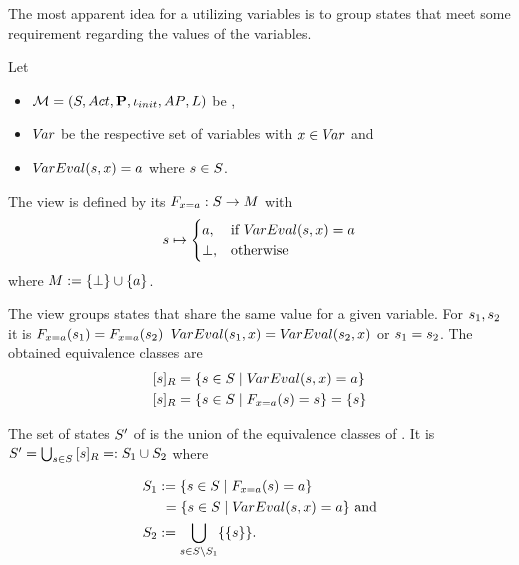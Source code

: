 \documentclass[preview]{standalone}
\begin{document}
The most apparent idea for a \viewN utilizing variables is to group states that meet some requirement regarding the values of the variables.



\begin{definition}
	Let
	\begin{itemize}
		\item ${{{\mathcal{M}}}} = {{({S}, {Act}, {\textbf{P}}, {\iota_{init}}, {AP}, {L})}}$ be \achgphN,
		\item ${V\!ar}$ be the respective set of variables with ${x} \in {V\!ar}$ and
		\item ${V\!arEval}({s}, {x}) = {a}$ where ${s} \in {S}$.		
	\end{itemize} 
	The view \viewparamvalueseq is defined by its \grpfctN ${{F_{{x} = {a}}}} : {S} \to {\ensuremath{{M}}}$ with
	\[
	{s} \mapsto
	\begin{cases}
		{a}, &\text{if } {V\!arEval}({s}, {x}) = {a}\\
		{\bot}, &\text{otherwise}
	\end{cases}
	\]
	where ${{M}} := {\{\bot\}} \cup \{a\}$.
\end{definition}

The view \viewparamvalueseq groups states that share the same value for a given variable. For ${s}_1, {s}_2$ it is ${{F_{{x} = {a}}}}({s}_1) = {{F_{{x} = {a}}}}({s}_2)$ \iffN ${V\!arEval}({s}_1, {x}) = {V\!arEval}({s}_2, {x})$ or ${s}_1 = {s}_2$. The obtained equivalence classes are
\begin{align*}
	{\ensuremath{{[{s}]_{{R}}}}} &= \{{s} \in {S} \mid {V\!arEval}({s}, {x}) = {a}\} \\
	{{[{s}]_{{R}}}} &= \{{s} \in {S} \mid {\ensuremath{{F_{{x} = {a}}}}}({s}) = {s}\} = \{{s}\}
\end{align*}

The set of states ${S}'$ of \viewparamvalueseq is the union of the equivalence classes of \eqrelview. It is ${S}' = \bigcup_{{s} \in {S}} {{[{s}]_{{R}}}} =: {S}_1 \cup {S}_2$ where

\begin{align*}
	{S}_1 &:= \{{s} \in {S} \mid {\ensuremath{{F_{{x} = {a}}}}}({s}) = {a}\} \\
	&\hspace{1.15mm}= \{{s} \in {S}  \mid {V\!arEval}({s}, {x}) = {a}\} \text{ and} \\
	{S}_2 &:= {\bigcup_{{s} \in {S} \setminus {S}_1}\{\{{s}\}\}}.
\end{align*}
\end{document}
